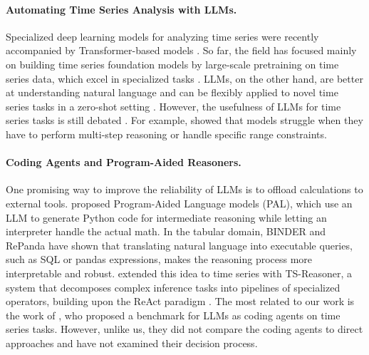 \documentclass[11pt]{article}
\renewcommand{\cite}{\citep}
\newcommand\TODO[1]{\textcolor{red!60!black}{\it [TODO: #1]}}
\begin{document}
\paragraph{Automating Time Series Analysis with LLMs.} 
Specialized deep learning models for analyzing time series \cite{oreshkin2019n,salinas2020deepar,wu2022timesnet} were recently accompanied by Transformer-based models \cite{zhou2021informer,wu2021autoformer}. So far, the field has focused mainly on building time series foundation models by large-scale pretraining on time series data, which excel in specialized tasks \cite{ye2025empowering,ansari2024chronos,das2024decoder}. LLMs, on the other hand, are better at understanding natural language and can be flexibly applied to novel time series tasks in a zero-shot setting \cite{abdullahi2025timeseriesa, zhang2024largea}. 
However, the usefulness of LLMs for time series tasks is still debated \cite{tan2024language,merrill2024language,fons2024evaluatinga,arai2025evaluating}.
For example, \citet{arai2025evaluating} showed that models struggle when they have to perform multi-step reasoning or handle specific range constraints.


\paragraph{Coding Agents and Program-Aided Reasoners.} One promising way to improve the reliability of LLMs is to offload calculations to external tools. \citet{gao2023pala} proposed Program-Aided Language models (PAL), which use an LLM to generate Python code for intermediate reasoning while letting an interpreter handle the actual math. In the tabular domain, BINDER \cite{cheng2023bindinga} and RePanda \cite{cheginirepandaa} have shown that translating natural language into executable queries, such as SQL or pandas expressions, makes the reasoning process more interpretable and robust. \citet{ye2025domainoriented} extended this idea to time series with TS-Reasoner, a system that decomposes complex inference tasks into pipelines of specialized operators, building upon the ReAct paradigm  \cite{yao2023reacta}. The most related to our work is the work of \citet{ye2025when}, who proposed a benchmark for LLMs as coding agents on time series tasks. However, unlike us, they did not compare the coding agents to direct approaches and have not examined their decision process.
\end{document}
